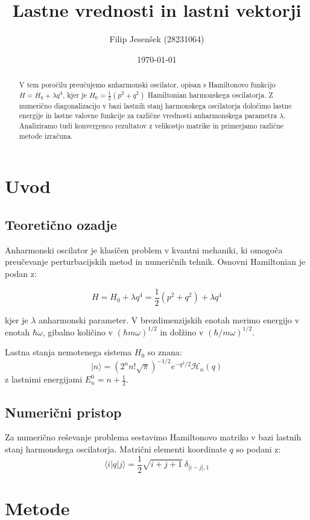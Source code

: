 \documentclass[12pt,a4paper]{article}
\title{Lastne vrednosti in lastni vektorji}
\author{Filip Jesenšek (28231064)}
\date{\today}
\begin{document}
\maketitle

\begin{abstract}
V tem poročilu preučujemo anharmonski oscilator, opisan s Hamiltonovo funkcijo $H = H_0 + \lambda q^4$, 
kjer je $H_0 = \frac{1}{2}(p^2 + q^2)$ Hamiltonian harmonskega oscilatorja. 
Z numerično diagonalizacijo v bazi lastnih stanj harmonskega oscilatorja določimo lastne energije in 
lastne valovne funkcije za različne vrednosti anharmonskega parametra $\lambda$. 
Analiziramo tudi konvergenco rezultatov z velikostjo matrike in primerjamo različne metode izračuna.
\end{abstract}

\tableofcontents

\newpage

\section{Uvod}

\subsection{Teoretično ozadje}
Anharmonski oscilator je klasičen problem v kvantni mehaniki, 
ki omogoča preučevanje perturbacijskih metod in numeričnih tehnik. 
Osnovni Hamiltonian je podan z:

\[
H = H_0 + \lambda q^4 = \frac{1}{2}(p^2 + q^2) + \lambda q^4
\]

kjer je $\lambda$ anharmonski parameter. 
V brezdimenzijskih enotah merimo energijo v enotah $\hbar\omega$, 
gibalno količino v $(\hbar m\omega)^{1/2}$ in dolžino v $(\hbar/m\omega)^{1/2}$.

Lastna stanja nemotenega sistema $H_0$ so znana:
\[
|n\rangle = (2^n n! \sqrt{\pi})^{-1/2} e^{-q^2/2} \mathcal{H}_n(q)
\]
z lastnimi energijami $E_n^0 = n + \frac{1}{2}$.

\subsection{Numerični pristop}
Za numerično reševanje problema sestavimo Hamiltonovo matriko v bazi lastnih stanj harmonskega oscilatorja. 
Matrični elementi koordinate $q$ so podani z:
\[
\langle i|q|j\rangle = \frac{1}{2}\sqrt{i+j+1}\ \delta_{|i-j|,1}
\]

\section{Metode}
\end{document}
